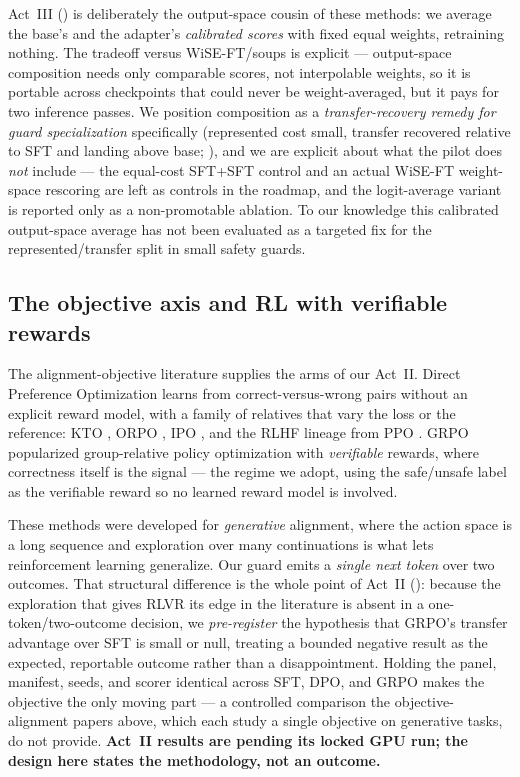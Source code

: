 Act~III () is deliberately the output-space cousin of these methods: we average the
base's and the adapter's \emph{calibrated scores} with fixed equal weights, retraining nothing. The
tradeoff versus WiSE-FT/soups is explicit --- output-space composition needs only comparable scores,
not interpolable weights, so it is portable across checkpoints that could never be weight-averaged, but
it pays for two inference passes. We position composition as a \emph{transfer-recovery remedy for guard
specialization} specifically (represented cost small, transfer recovered relative to SFT and landing
above base; ), and we are explicit about what the pilot does
\emph{not} include --- the equal-cost SFT+SFT control and an actual WiSE-FT weight-space rescoring are
left as controls in the roadmap, and the logit-average variant is reported only as a non-promotable
ablation. To our knowledge this calibrated output-space average has not been evaluated as a targeted fix
for the represented/transfer split in small safety guards.

\subsection{The objective axis and RL with verifiable rewards}
\label{sec:related-objective}
The alignment-objective literature supplies the arms of our Act~II. Direct Preference Optimization
\citep{rafailov2023dpo} learns from correct-versus-wrong pairs without an explicit reward model, with a
family of relatives that vary the loss or the reference: KTO \citep{ethayarajh2024kto}, ORPO
\citep{hong2024orpo}, IPO \citep{azar2023ipo}, and the RLHF lineage from PPO
\citep{schulman2017ppo,ouyang2022instructgpt}. GRPO \citep{shao2024deepseekmath} popularized group-relative
policy optimization with \emph{verifiable} rewards, where correctness itself is the signal --- the regime
we adopt, using the safe/unsafe label as the verifiable reward so no learned reward model is involved.

These methods were developed for \emph{generative} alignment, where the action space is a long sequence
and exploration over many continuations is what lets reinforcement learning generalize. Our guard emits a
\emph{single next token} over two outcomes. That structural difference is the whole point of Act~II
(): because the exploration that gives RLVR its edge in the literature is absent in a
one-token/two-outcome decision, we \emph{pre-register} the hypothesis that GRPO's transfer advantage over
SFT is small or null, treating a bounded negative result as the expected, reportable outcome rather than a
disappointment. Holding the panel, manifest, seeds, and scorer identical across SFT, DPO, and GRPO makes
the objective the only moving part --- a controlled comparison the objective-alignment papers above, which
each study a single objective on generative tasks, do not provide. \textbf{Act~II results are pending its
locked GPU run; the design here states the methodology, not an outcome.}

